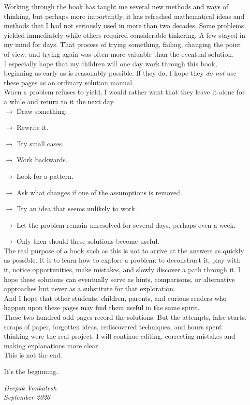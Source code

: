 \documentclass[10pt]{article}
\newcounter{problem}
\begin{document}
Working through the book has taught me several new methods and ways of thinking, but perhaps more importantly, it has refreshed mathematical ideas and methods that I had not seriously used in more than two decades. Some problems yielded immediately while others required considerable tinkering. A few stayed in my mind for days. That process of trying something, failing, changing the point of view, and trying again was often more valuable than the eventual solution. \\

I especially hope that my children will one day work through this book, beginning as early as is reasonably possible. If they do, I hope they \emph{do not} use these pages as an ordinary solution manual. \\

When a problem refuses to yield, I would rather want that they leave it alone for a while and return to it the next day. \\

$\rightarrow$ Draw something.

$\rightarrow$ Rewrite it.

$\rightarrow$ Try small cases.

$\rightarrow$ Work backwards.

$\rightarrow$ Look for a pattern.

$\rightarrow$ Ask what changes if one of the assumptions is removed.

$\rightarrow$ Try an idea that seems unlikely to work.

$\rightarrow$ Let the problem remain unresolved for several days, perhaps even a week.

$\rightarrow$ Only then should these solutions become useful. \\

The real purpose of a book such as this is not to arrive at the answers as quickly as possible. It is to learn how to explore a problem: to deconstruct it, play with it, notice opportunities, make mistakes, and slowly discover a path through it. I hope these solutions can eventually serve as hints, comparisons, or alternative approaches but never as a substitute for that exploration.\\

And I hope that other students, children, parents, and curious readers who happen upon these pages may find them useful in the same spirit.\\

These two hundred odd pages record the solutions. But the attempts, false starts, scraps of paper, forgotten ideas, rediscovered techniques, and hours spent thinking were the real project. I will continue editing, correcting mistakes and making explanations more clear. \\

This is not the end.

It's the beginning.

\begin{flushright}
\emph{Deepak Venkatesh}\\
\emph{September 2026}
\end{flushright}
\end{document}

